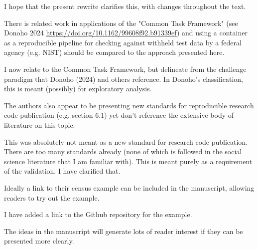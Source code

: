 \begin{response}
    I hope that the present rewrite clarifies this, with changes throughout the text.
\end{response}

\begin{referee}
    
There is
related work in applications of the "Common Task Framework" (see Donoho 2024 \url{https://doi.org/10.1162/99608f92.b91339ef})
and using a container as a reproducible pipeline for checking against withheld test data by a federal
agency (e.g. NIST) should be compared to the approach presented here. 

\end{referee}

\begin{response}
    I now relate to the Common Task Framework, but delineate from the challenge paradigm that Donoho (2024) and others reference. In Donoho's classification, this is meant (possibly) for exploratory analysis. 
\end{response}

\begin{referee}

The authors also appear to
be presenting new standards for reproducible research code publication (e.g. section 6.1) yet don't
reference the extensive body of literature on this topic. 

\end{referee}

\begin{response}
    This was absolutely not meant as a new standard for research code publication. There are too many standards already (none of which is followed in the social science literature that I am familiar with). This is meant purely as a requirement of the validation. I have clarified that.
\end{response}

\begin{referee}
    
Ideally a link to their census example can be
included in the manuscript, allowing readers to try out the example. 

\end{referee}

\begin{response}
    I have added a link to the Github repository for the example.
\end{response}


\begin{referee}
The ideas in the manuscript will
generate lots of reader interest if they can be presented more clearly.
\end{referee}

